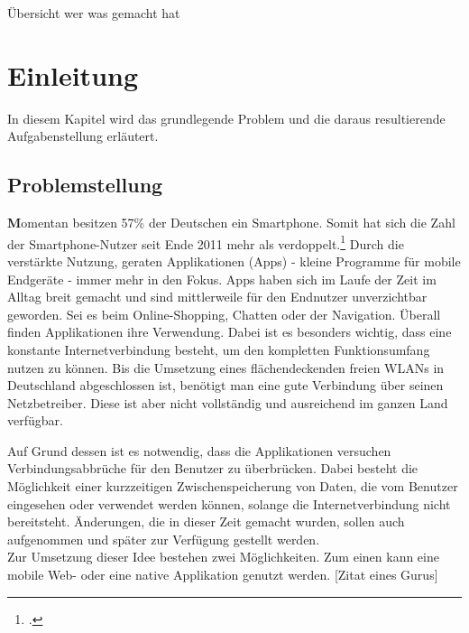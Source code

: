 Übersicht wer was gemacht hat

\chapter{Einleitung}
\label{cha:einleitung}
In diesem Kapitel wird das grundlegende Problem und die daraus resultierende Aufgabenstellung erläutert.

\section{Problemstellung}
\label{sec:problemstellung}

\textbf
Momentan besitzen 57\% der Deutschen ein Smartphone. Somit hat sich die Zahl der Smartphone-Nutzer seit Ende 2011 mehr als verdoppelt.\footcite{Statista}
Durch die verstärkte Nutzung, geraten Applikationen (Apps) - kleine Programme für mobile Endgeräte - immer mehr in den Fokus.
Apps haben sich im Laufe der Zeit im Alltag breit gemacht und sind mittlerweile für den Endnutzer unverzichtbar geworden. Sei es beim Online-Shopping, Chatten oder der Navigation. Überall finden Applikationen ihre Verwendung.
Dabei ist es besonders wichtig, dass eine konstante Internetverbindung besteht, um den kompletten Funktionsumfang nutzen zu können.
Bis die Umsetzung eines flächendeckenden freien WLANs in Deutschland abgeschlossen ist, benötigt man eine gute Verbindung über seinen Netzbetreiber. Diese ist aber nicht vollständig und ausreichend im ganzen Land verfügbar.

Auf Grund dessen ist es notwendig, dass die Applikationen versuchen Verbindungsabbrüche für den Benutzer zu überbrücken. Dabei besteht die Möglichkeit einer kurzzeitigen Zwischenspeicherung von Daten, die vom Benutzer eingesehen oder verwendet werden können, solange die Internetverbindung nicht bereitsteht. Änderungen, die in dieser Zeit gemacht wurden, sollen auch aufgenommen und später zur Verfügung gestellt werden.\\
Zur Umsetzung dieser Idee bestehen zwei Möglichkeiten. Zum einen kann eine mobile Web- oder eine native Applikation genutzt werden. [Zitat eines Gurus]




